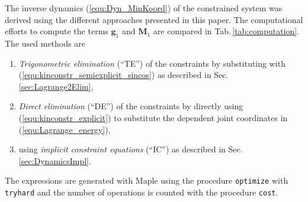 \documentclass{svproc}
\newcommand{\bm}[1]{\boldsymbol{#1}}
\begin{document}
The inverse dynamics (\ref{equ:Dyn_MinKoord}) of the constrained system was derived using the different approaches presented in this paper.
The computational efforts to compute the terms $\bm{g}_1$ and $\bm{M}_1$ are compared in Tab.\,\ref{tab:computation}.
The used methods are 
%
\begin{enumerate}
    \item \emph{Trigonometric elimination} (``TE'') of the constraints by substituting with (\ref{equ:kinconstr_semiexplicit_sincos}) as described in Sec.\,\ref{sec:Lagrange2Elim}, 
    \item \emph{Direct elimination} (``DE'') of the constraints by directly using (\ref{equ:kinconstr_explicit}) to substitute the dependent joint coordinates in (\ref{equ:Lagrange_energy}),
    \item using \emph{implicit constraint equations} (``IC'') as described in Sec.\,\ref{sec:DynamicsImpl}.
\end{enumerate}
%
The expressions are generated with Maple using the procedure \texttt{optimize} with \texttt{tryhard} and the number of operations is counted with the procedure \texttt{cost}.
%
\end{document}
